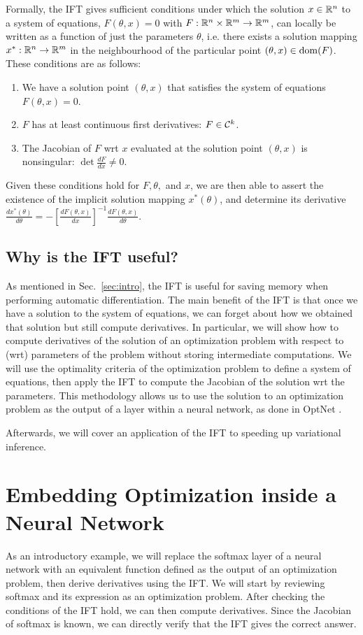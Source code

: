 \documentclass[11pt]{article}
\begin{document}
Formally, the IFT gives sufficient conditions under which the solution $x\in\mathbb{R}^n$
to a system of equations, $F(\theta, x) = 0$ with $F: \mathbb{R}^n\times\mathbb{R}^m\to\mathbb{R}^m$,
can locally be written as a function of just the parameters $\theta$,
i.e. there exists a solution mapping $x^*:\mathbb{R}^n\to\mathbb{R}^m$
in the neighbourhood of the particular point $(\theta,x)\in\mathrm{dom }(F)$.
These conditions are as follows:
\begin{enumerate}
\item We have a solution point $(\theta, x)$ that satisfies the system of equations
    $F(\theta, x) = 0$.
\item $F$ has at least continuous first derivatives: $F \in \mathcal{C}^k$.
\item The Jacobian of $F$ wrt $x$ evaluated at the solution point $(\theta,x)$ is nonsingular:
    $\det \frac{d F}{d x} \neq 0$.
\end{enumerate}
Given these conditions hold for $F,\theta,$ and $x$, we are then
able to assert the existence of the implicit solution mapping $x^*(\theta)$,
and determine its derivative
$\frac{d x^*(\theta)}{d\theta} = -[\frac{dF(\theta,x)}{dx}]^{-1}
    \frac{d F(\theta,x)}{d\theta}$.

\subsection{Why is the IFT useful?}
As mentioned in Sec.~\ref{sec:intro}, the IFT is useful for saving memory when performing
automatic differentiation.
The main benefit of the IFT is that once we have a solution to the system of equations,
we can forget about how we obtained that solution but still compute derivatives.
In particular, we will show how to compute derivatives of the solution of an optimization problem
with respect to (wrt) parameters of the problem without storing intermediate computations.
We will use the optimality criteria of the optimization problem to define a system of equations,
then apply the IFT to compute the Jacobian of the solution wrt the parameters.
This methodology allows us to use the solution to an optimization problem
as the output of a layer within a neural network,
as done in OptNet \citep{optnet}.

Afterwards, we will cover an application of the IFT to speeding up variational inference.

\section{Embedding Optimization inside a Neural Network}
As an introductory example,
we will replace the softmax layer of a neural network with an equivalent function
defined as the output of an optimization problem, then derive derivatives using the IFT.
We will start by reviewing softmax and its expression as an optimization problem.
After checking the conditions of the IFT hold, we can then compute derivatives.
Since the Jacobian of softmax is known, we can directly verify that the IFT gives
the correct answer.
\end{document}
